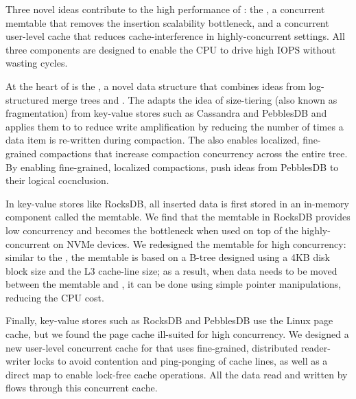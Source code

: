 Three novel ideas contribute to the high performance of \sysname: the
\emph{\datastruct}, a concurrent memtable that removes the insertion scalability bottleneck,
and a concurrent user-level cache that reduces cache-interference in highly-concurrent settings.
All three components are designed to enable the CPU to drive high IOPS without wasting cycles.

At the heart of \sysname is the \datastruct, a novel data structure
that combines ideas from log-structured merge trees and \bets.  The
\datastruct adapts the idea of size-tiering (also known as
fragmentation) from key-value stores such as Cassandra and PebblesDB
and applies them to \bets to reduce write amplification by reducing
the number of times a data item is re-written during compaction.  The
\datastruct also enables localized, fine-grained compactions that
increase compaction concurrency across the entire tree.  By enabling
fine-grained, localized compactions, \datastructs push ideas from
PebblesDB to their logical cocnclusion.

In key-value stores like RocksDB, all
inserted data is first stored in an in-memory component called the
memtable. We find that the
memtable in RocksDB provides low concurrency and becomes the
bottleneck when used on top of the highly-concurrent \datastruct on
NVMe devices. We redesigned the memtable for high concurrency: similar to the
\datastruct, the \sysname memtable is based on a B-tree designed using
a 4KB disk block size and the L3 cache-line size; as a result, when data
needs to be moved between the memtable and \datastruct, it can be done
using simple pointer manipulations, reducing the CPU cost.

Finally, key-value stores such as RocksDB and PebblesDB use the Linux page
cache, but we found the page cache ill-suited for high concurrency. 
We designed a new user-level concurrent
cache for \sysname that uses fine-grained, distributed reader-writer locks to avoid contention and
ping-ponging of cache lines, as well as a direct map
to enable lock-free cache operations. All the data read and written by \sysname
flows through this concurrent cache.


